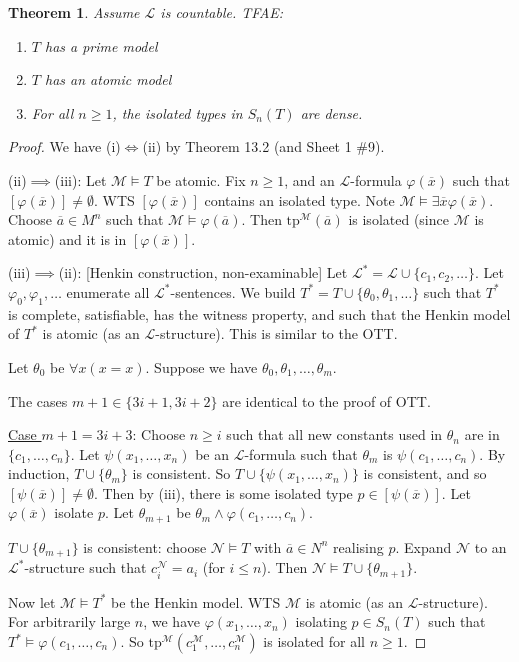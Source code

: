 \documentclass[]{article}
\theoremstyle{custhm}
\newtheorem{theorem}{Theorem}[section]
\theoremstyle{cusdef}
\theoremstyle{custhm}
\theoremstyle{custhm}
\theoremstyle{custhm}
\theoremstyle{ex}
\theoremstyle{custhm}
\theoremstyle{cusdef}
\theoremstyle{remark}
\theoremstyle{remark}
\theoremstyle{numremark}
\renewcommand{\L}{\mathcal{L}}
\newcommand{\M}{\mathcal{M}}
\renewcommand{\phi}{\varphi}
\renewcommand{\bar}{\overline}
\newcommand{\tp}{\textrm{tp}}
\newcommand{\N}{\mathcal{N}}
\begin{document}
\begin{theorem}
Assume $\L$ is countable. TFAE:
\begin{enumerate}[label=\roman*)]
	\item $T$ has a prime model
	\item $T$ has an atomic model
	\item For all $n\ge 1$, the isolated types in $S_n(T)$ are dense.
\end{enumerate}
\end{theorem}
\begin{proof}
We have (i)$\iff$(ii) by Theorem 13.2 (and Sheet 1 \#9).

(ii)$\implies$(iii): Let $\M\models T$ be atomic. Fix $n\ge 1$, and an $\L$-formula $\phi(\bar{x})$ such that $[\phi(\bar{x})]\ne \emptyset$. WTS $[\phi(\bar{x})]$ contains an isolated type. Note $\M\models \exists \bar{x}\phi(\bar{x})$. Choose $\bar{a}\in M^n$ such that $\M\models \phi(\bar{a})$. Then $\tp^\M(\bar{a})$ is isolated (since $\M$ is atomic) and it is in $[\phi(\bar{x})]$.

(iii)$\implies$(ii): [Henkin construction, non-examinable] Let $\L^\ast = \L\cup\{c_1,c_2,\dots\}$. Let $\phi_0,\phi_1,\dots$ enumerate all $\L^\ast$-sentences. We build $T^\ast = T \cup \{\theta_0,\theta_1,\dots\}$ such that $T^\ast$ is complete, satisfiable, has the witness property, and such that the Henkin model of $T^\ast$ is atomic (as an $\L$-structure). This is similar to the OTT.

Let $\theta_0$ be $\forall x(x=x)$. Suppose we have $\theta_0,\theta_1,\dots,\theta_m$.

The cases $m+1\in \{3i+1,3i+2\}$ are identical to the proof of OTT.

\underline{Case $m+1 = 3i+3$}: Choose $n\ge i$ such that all new constants used in $\theta_n$ are in $\{c_1,\dots,c_n\}$. Let $\psi(x_1,\dots,x_n)$ be an $\L$-formula such that $\theta_m$ is $\psi(c_1,\dots,c_n)$. By induction, $T\cup\{\theta_m\}$ is consistent. So $T\cup\{\psi(x_1,\dots,x_n)\}$ is consistent, and so $[\psi(\bar{x})]\ne \emptyset$. Then by (iii), there is some isolated type $p \in [\psi(\bar{x})]$. Let $\phi(\bar{x})$ isolate $p$. Let $\theta_{m+1}$ be $\theta_m\land \phi(c_1,\dots,c_n)$.

$T\cup\{\theta_{m+1}\}$ is consistent: choose $\N\models T$ with $\bar{a}\in N^n$ realising $p$. Expand $\N$ to an $\L^\ast$-structure such that $c_i^\N = a_i$ (for $i\le n$). Then $\N\models T\cup\{\theta_{m+1}\}$.

Now let $\M\models T^\ast$ be the Henkin model. WTS $\M$ is atomic (as an $\L$-structure). For arbitrarily large $n$, we have $\phi(x_1,\dots,x_n)$ isolating $p \in S_n(T)$ such that $T^\ast \models \phi(c_1,\dots,c_n)$. So $\tp^\M(c_1^\M,\dots,c_n^\M)$ is isolated for all $n\ge1$.


\end{proof}
\end{document}
